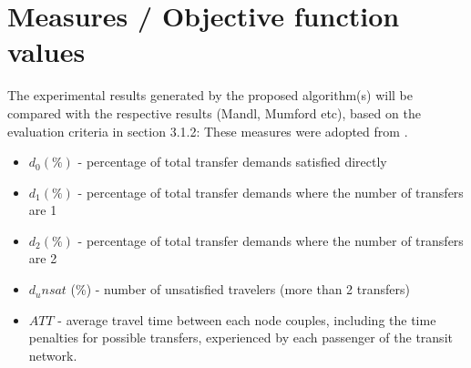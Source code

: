 \section{Measures / Objective function values}
The experimental results generated by the proposed algorithm(s) will be compared with the respective results (Mandl, Mumford etc), based on the evaluation criteria in section 3.1.2: 
These measures were adopted from \citet{kechagiopoulos14}.

\begin{itemize}
\item $d_0 (\%)$ - percentage of total transfer demands satisfied directly
\item $d_1 (\%)$ - percentage of total transfer demands where the number of transfers are 1
\item $d_2 (\%)$ - percentage of total transfer demands where the number of transfers are 2
\item $d_unsat$ (\%) - number of unsatisfied travelers (more than 2 transfers)
\item $ATT$  - average travel time between each node couples, including the time penalties for possible transfers, experienced by each passenger of the transit network.
\end{itemize}

